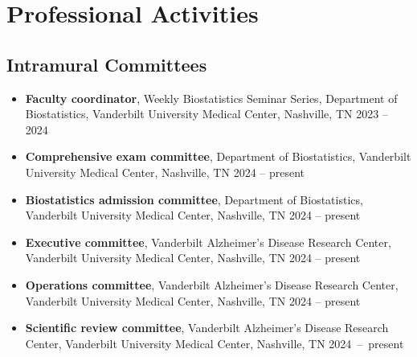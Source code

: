 \documentclass[12pt]{article}
\begin{document}
	\section*{Professional Activities}
	
	\subsection*{Intramural Committees}
	\begin{itemize}
		\item {\bf Faculty coordinator}, Weekly Biostatistics 
		Seminar Series, Department of Biostatistics, Vanderbilt 
		University Medical Center, Nashville, TN \hfill 2023 -- 2024
		\item {\bf Comprehensive exam committee}, Department of 
		Biostatistics, Vanderbilt University Medical Center, 
		Nashville, TN \hfill 2024 -- present
		\item {\bf Biostatistics admission committee}, Department of 
		Biostatistics, Vanderbilt University Medical Center, 
		Nashville, TN \hfill 2024 -- present
		\item {\bf Executive committee}, Vanderbilt Alzheimer's 
		Disease Research Center, Vanderbilt University Medical 
		Center, Nashville, TN \hfill 2024 -- present
		\item {\bf Operations committee}, Vanderbilt Alzheimer's 
		Disease Research Center, Vanderbilt University Medical 
		Center, Nashville, TN \hfill 2024 -- present
		\item {\bf Scientific review committee}, Vanderbilt 
		Alzheimer's Disease Research Center, Vanderbilt University 
		Medical Center, Nashville, TN \hfill \mbox{2024 -- present}
	\end{itemize}
	
\end{document}
